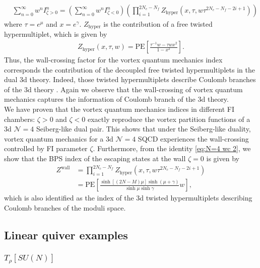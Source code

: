 \documentclass[a4paper,11pt]{article}
\begin{document}
\begin{align}
\label{eq:N=4 wc 2}
& \sum_{n = 0}^\infty w^n I^n_{\zeta > 0} = \left(\sum_{n = 0}^\infty w^n I^n_{\zeta < 0}\right) \left(\prod_{i = 1}^{2 N_c-N_f} Z_\text{hyper} (x,\tau,w \tau^{2 N_c-N_f-2 i+1})\right)
\end{align}
where $\tau = e^\mu$ and $x = e^\gamma$. $Z_\text{hyper}$ is the contribution of a free twisted hypermultiplet, which is given by
\begin{align}
Z_\text{hyper} (x,\tau,w) = \mathrm{PE} \left[\frac{\tau^{-1} w-\tau w x^2}{1-x^2}\right].
\end{align}
Thus, the wall-crossing factor for the vortex quantum mechanics index corresponds the contribution of the decoupled free twisted hypermultiplets in the dual 3d theory. Indeed, those twisted hypermultiplets describe Coulomb branches of the 3d theory \cite{Gaiotto:2008ak,Kim:2012uz,Yaakov:2013fza,Gaiotto:2013bwa}. Again we observe that the wall-crossing of vortex quantum mechanics captures the information of Coulomb branch of the 3d theory.
\\


We have proven that the vortex quantum mechanics indices in different FI chambers: $\zeta > 0$ and $\zeta < 0$ exactly reproduce the vortex partition functions of a 3d $\mathcal N = 4$ Seiberg-like dual pair. This shows that under the Seiberg-like duality, vortex quantum mechanics for a 3d $\mathcal N = 4$ SQCD experiences the wall-crossing controlled by FI parameter $\zeta$. Furthermore, from the identity \eqref{eq:N=4 wc 2}, we show that the BPS index of the escaping states at the wall $\zeta = 0$ is given by
\begin{align}
Z^\text{wall} &= \prod_{i = 1}^{2 N_c-N_f} Z_\text{hyper} (x,\tau,w \tau^{2 N_c-N_f-2 i+1}) \\
&= \mathrm{PE} \left[\frac{\sinh \left[(2 N-M) \mu\right] \sinh (\mu+\gamma)}{\sinh \mu \sinh \gamma} w\right], \label{eq:wall}
\end{align}
which is also identified as the index of the 3d twisted hypermultiplets describing Coulomb branches of the moduli space.
\\



\subsection{Linear quiver examples}
\subsubsection{$T_\rho [SU(N)]$}
\end{document}
